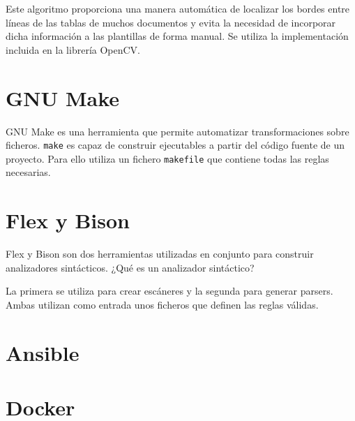 Este algoritmo proporciona una manera automática de localizar los bordes entre líneas de las tablas de muchos documentos y evita la necesidad de incorporar dicha información a las plantillas de forma manual. Se utiliza la implementación incluida en la librería OpenCV.

\section{GNU Make}

GNU Make es una herramienta que permite automatizar transformaciones sobre ficheros. \verb|make| es capaz de construir ejecutables a partir del código fuente de un proyecto. Para ello utiliza un fichero \verb|makefile| que contiene todas las reglas necesarias.

\section{Flex y Bison}

Flex y Bison son dos herramientas utilizadas en conjunto para construir analizadores sintácticos. ¿Qué es un analizador sintáctico?

La primera se utiliza para crear escáneres y la segunda para generar parsers. Ambas utilizan como entrada unos ficheros que definen las reglas válidas.

\section{Ansible}



\section{Docker}




